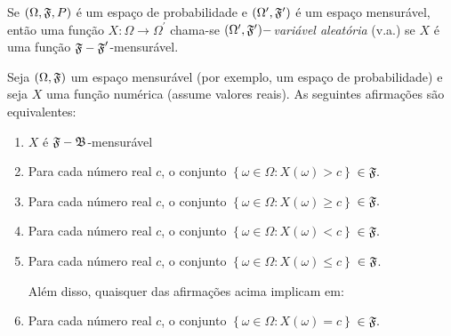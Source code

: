 \begin{frame}
\begin{defi}
Se $(\Omega ,\frak{F},P)$ é um espaço de probabilidade e $(\Omega ^{\prime
},\frak{F}^{\prime })$ é um espaço mensurável, então uma função $
X:\Omega \rightarrow \Omega ^{\prime }$ chama-se $(\Omega ^{\prime },\frak{F}%
^{\prime })-$\emph{variável aleatória} (v.a.) se $X$ é uma função
$\frak{F-F}^{\prime }$-mensurável.
\end{defi}

\begin{prop}
Seja $\left( \Omega ,\frak{F}\right) $ um espaço mensurável (por exemplo, um espaço de probabilidade) e seja $X$ uma
função numérica (assume valores reais). As seguintes afirmações são equivalentes:

\begin{enumerate}
	\item  $X$ é $\frak{F-B}$-mensurável
	
	\item  Para cada n\'{u}mero real $c$, o conjunto $\left\{ \omega\in
	\Omega :X(\omega)>c\right\} $ $\in \frak{F.}$
	
	\item  Para cada n\'{u}mero real $c$, o conjunto $\left\{ \omega\in
	\Omega :X(\omega)\geq c\right\} $ $\in \frak{F.}$
	
	\item  Para cada n\'{u}mero real  $c$, o conjunto $\left\{ \omega\in
	\Omega :X(\omega)<c\right\} $ $\in \frak{F.}$
	
	\item  Para cada n\'{u}mero real  $c$, o conjunto $\left\{ \omega\in
	\Omega :X(\omega)\leq c\right\} $ $\in \frak{F}$.
	
	Além disso, quaisquer das afirmações acima implicam em:
	
	\item  Para cada n\'{u}mero real $c$, o conjunto $\left\{ \omega\in
	\Omega :X(\omega)=c\right\} $ $\in \frak{F.}$
\end{enumerate}
\end{prop}



\end{frame}
%
%
